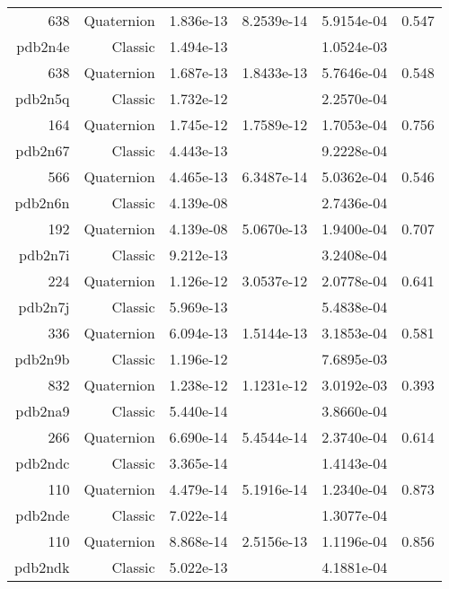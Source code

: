 \begin{xltabular}{\textwidth}{r|rS[table-format=1.3e+2]S[table-format=1.4e+2]S[table-format=1.4e+2]S[table-format=-1.3]}
638 & Quaternion & 1.836e-13 & 8.2539e-14 & 5.9154e-04 & 0.547\\  \addlinespace
{\color{red} pdb2n4e } & Classic & 1.494e-13 &  & 1.0524e-03 & \\
638 & Quaternion & 1.687e-13 & 1.8433e-13 & 5.7646e-04 & 0.548\\  \addlinespace
{\color{red} pdb2n5q } & Classic & 1.732e-12 &  & 2.2570e-04 & \\
164 & Quaternion & 1.745e-12 & 1.7589e-12 & 1.7053e-04 & 0.756\\  \addlinespace
{\color{red} pdb2n67 } & Classic & 4.443e-13 &  & 9.2228e-04 & \\
566 & Quaternion & 4.465e-13 & 6.3487e-14 & 5.0362e-04 & 0.546\\  \addlinespace
{\color{red} pdb2n6n } & Classic & 4.139e-08 &  & 2.7436e-04 & \\
192 & Quaternion & 4.139e-08 & 5.0670e-13 & 1.9400e-04 & 0.707\\  \addlinespace
{\color{red} pdb2n7i } & Classic & 9.212e-13 &  & 3.2408e-04 & \\
224 & Quaternion & 1.126e-12 & 3.0537e-12 & 2.0778e-04 & 0.641\\  \addlinespace
{\color{red} pdb2n7j } & Classic & 5.969e-13 &  & 5.4838e-04 & \\
336 & Quaternion & 6.094e-13 & 1.5144e-13 & 3.1853e-04 & 0.581\\  \addlinespace
{\color{red} pdb2n9b } & Classic & 1.196e-12 &  & 7.6895e-03 & \\
832 & Quaternion & 1.238e-12 & 1.1231e-12 & 3.0192e-03 & 0.393\\  \addlinespace
{\color{red} pdb2na9 } & Classic & 5.440e-14 &  & 3.8660e-04 & \\
266 & Quaternion & 6.690e-14 & 5.4544e-14 & 2.3740e-04 & 0.614\\  \addlinespace
{\color{red} pdb2ndc } & Classic & 3.365e-14 &  & 1.4143e-04 & \\
110 & Quaternion & 4.479e-14 & 5.1916e-14 & 1.2340e-04 & 0.873\\  \addlinespace
{\color{red} pdb2nde } & Classic & 7.022e-14 &  & 1.3077e-04 & \\
110 & Quaternion & 8.868e-14 & 2.5156e-13 & 1.1196e-04 & 0.856\\  \addlinespace
{\color{red} pdb2ndk } & Classic & 5.022e-13 &  & 4.1881e-04 & \\

\end{xltabular}

